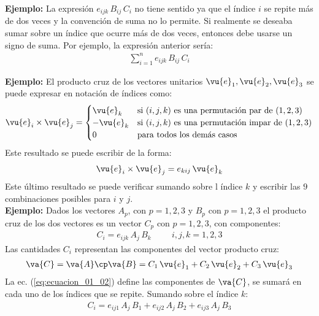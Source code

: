 \noindent
\textbf{Ejemplo: } La expresión $e_{ijk} \, B_{ij} \, C_{i}$ no tiene sentido ya que el índice $i$ se repite más de dos veces y la convención de suma no lo permite. Si realmente se deseaba sumar sobre un índice que ocurre más de dos veces, entonces debe usarse un signo de suma. Por ejemplo, la expresión anterior sería:
\begin{align*}
\sum_{i=1}^{n} e_{ijk} \, B_{ij} \, C_{i}
\end{align*}

\noindent
\textbf{Ejemplo: } El producto cruz de los vectores unitarios $\vu{e}_{1}, \vu{e}_{2}, \vu{e}_{3}$ se puede expresar en notación de índices como:
\begin{align*}
\vu{e}_{i} \times \vu{e}_{j} = \begin{cases}
\vu{e}_{k} & \mbox{si } (i, j, k) \mbox{ es una permutación par de } (1, 2, 3)   \\
-\vu{e}_{k} & \mbox{si } (i, j, k) \mbox{ es una permutación impar de } (1, 2, 3) \\
0 & \mbox{para todos los demás casos}
\end{cases}
\end{align*}
Este resultado se puede escribir de la forma:
\begin{align*}
\vu{e}_{i} \times \vu{e}_{j} = e_{kij} \, \vu{e}_{k}
\end{align*}
Este último resultado se puede verificar sumando sobre l índice $k$ y escribir las $9$ combinaciones posibles para $i$ y $j$.
\\[0.5em]
\noindent
\textbf{Ejemplo: } Dados los vectores $A_{p}$, con $p = 1, 2, 3$ y $B_{p}$ con $p = 1, 2, 3$ el producto cruz de los dos vectores  es un vector $C_{p}$ con $p = 1, 2, 3$, con componentes:
\begin{align}
C_{i} = e_{ijk} \, A_{j} \, B_{k} \hspace{1cm} i, j, k = 1, 2, 3
\label{eq:ecuacion_01_02}
\end{align}
Las cantidades $C_{i}$ representan las componentes del vector producto cruz:
\begin{align*}
\va{C} = \va{A} \cp \va{B} = C_{1} \, \vu{e}_{1} + C_{2} \, \vu{e}_{2} + C_{3} \, \vu{e}_{3}
\end{align*}
La ec. (\ref{eq:ecuacion_01_02}) define las componentes de $\va{C}$, se sumará en cada uno de los índices que
se repite. Sumando sobre el índice $k$:
\begin{align}
C_{i} = e_{ij1} \, A_{j} \, B_{1} + e_{ij2} \, A_{j} \, B_{2} + e_{ij3} \, A_{j} \, B_{3}
\label{eq:ecuacion_01_03}
\end{align}
